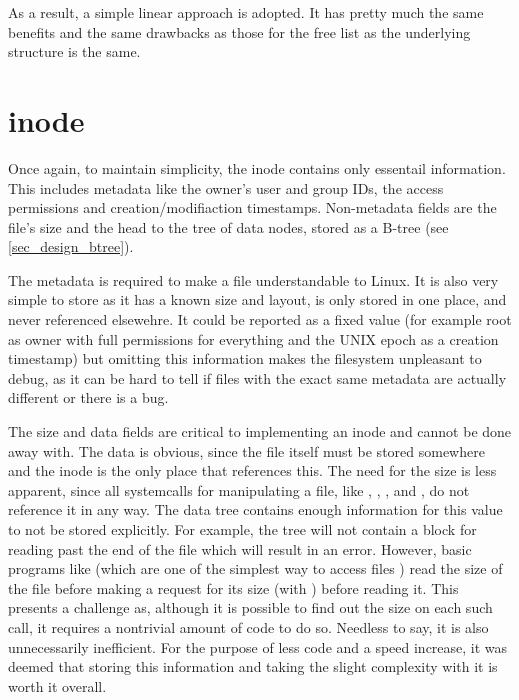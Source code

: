         As a result, a simple linear approach is adopted. It has pretty much
        the same benefits and the same drawbacks as those for the free list as
        the underlying structure is the same.

    \section{inode}

        Once again, to maintain simplicity, the inode contains only essentail
        information. This includes metadata like the owner's user and group
        IDs, the access permissions and creation/modifiaction timestamps.
        Non-metadata fields are the file's size and the head to the tree of
        data nodes, stored as a B-tree (see \ref{sec_design_btree}).

        The metadata is required to make a file understandable to Linux. It is
        also very simple to store as it has a known size and layout, is only
        stored in one place, and never referenced elsewehre. It could be
        reported as a fixed value (for example root as owner with full
        permissions for everything and the UNIX epoch as a creation timestamp)
        but omitting this information makes the filesystem unpleasant to debug,
        as it can be hard to tell if files with the exact same metadata are
        actually different or there is a bug.

        The size and data fields are critical to implementing an inode and
        cannot be done away with. The data is obvious, since the file itself
        must be stored somewhere and the inode is the only place that
        references this. The need for the size is less apparent, since all
        systemcalls for manipulating a file, like ,
        , ,  and ,
        do not reference it in any way. The data tree contains enough
        information for this value to not be stored explicitly.  For example,
        the tree will not contain a block for reading past the end of the file
        which will result in an error. However, basic programs like
         (which are one of the simplest way to access files
        \cite{TLDP_proc_access}) read the size of the file before making a
        request for its size (with ) before reading it. This
        presents a challenge as, although it is possible to find out the size
        on each such call, it requires a nontrivial amount of code to do so.
        Needless to say, it is also unnecessarily inefficient. For the purpose
        of less code and a speed increase, it was deemed that storing this
        information and taking the slight complexity with it is worth it
        overall.

